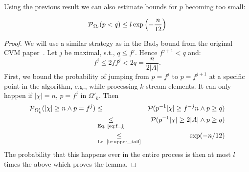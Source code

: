 Using the previous result we can also estimate bounds for $p$ becoming too small:
\begin{lemma}\label{le:low_p}
\[
\operatorname{\mathcal P}_{\Omega_l}(p < q) \leq l \exp\left( - \frac{n}{12}\right)
\]
\end{lemma}
\begin{proof}
We will use a similar strategy as in the $\mathrm{Bad}_2$ bound from the original CVM paper~\cite{chakraborty2022}.
Let $j$ be maximal, s.t., $q \leq f^j$. Hence $f^{j+1} < q$ and:
\begin{equation}
\label{eq:f_j}
  f^j \leq 2f f^j < 2q = \frac{n}{2|A|} \textrm{.}
\end{equation}
First, we bound the probability of jumping from $p=f^j$ to $p=f^{j+1}$ at a specific point in the
algorithm, e.g., while processing $k$ stream elements. It can only happen if $|\chi|=n$, $p=f^j$
in $\Omega'_k$. Then
\begin{eqnarray*}
  \operatorname{\mathcal P}_{\Omega'_k} ( |\chi| \geq n \wedge p=f^j) & \leq &
    \operatorname{\mathcal P}( p^{-1} |\chi| \geq f^{-j} n \wedge p \geq q) \\
    & \underset{\textrm{Eq.~\ref{eq:f_j}}}{\leq} & \operatorname{\mathcal P}( p^{-1} |\chi| \geq 2|A| \wedge p \geq q)\\
    & \underset{\textrm{Le.~\ref{le:upper_tail}}}{\leq} & \exp(- n/12)
\end{eqnarray*}
The probability that this happens ever in the entire process is then at most $l$ times the above
which proves the lemma.
\end{proof}

